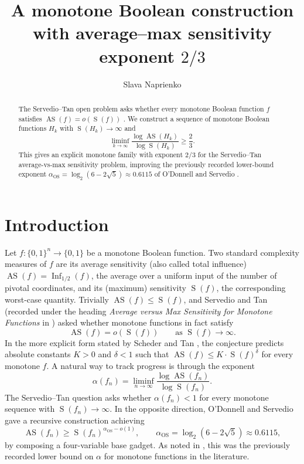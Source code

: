 \documentclass[11pt]{article}
\title{A monotone Boolean construction with average--max sensitivity exponent \(2/3\)}
\author{Slava Naprienko}
\date{}
\newcommand{\Inf}{\operatorname{Inf}}
\newcommand{\AS}{\operatorname{AS}}
\newcommand{\sens}{\operatorname{S}}
\begin{document}
\maketitle

\begin{abstract}
The Servedio--Tan open problem asks whether every monotone Boolean function \(f\) satisfies \(\AS(f)=o(\sens(f))\) \cite{FHH+14,ScTa13}. We construct a sequence of monotone Boolean functions \(H_k\) with \(\sens(H_k)\to\infty\) and
\[
    \liminf_{k\to\infty}\frac{\log\AS(H_k)}{\log\sens(H_k)}\ge \frac{2}{3}.
\]
This gives an explicit monotone family with exponent \(2/3\) for the Servedio--Tan average-vs-max sensitivity problem, improving the previously recorded lower-bound exponent
\(
    \alpha_{\mathrm{OS}}=\log_2(6-2\sqrt 5)\approx 0.6115
\)
of O'Donnell and Servedio \cite{OS07}.
\end{abstract}

\section{Introduction}

Let \(f:\{0,1\}^n\to\{0,1\}\) be a monotone Boolean function. Two standard complexity measures of \(f\) are its average sensitivity (also called total influence) \(\AS(f)=\Inf_{1/2}(f)\), the average over a uniform input of the number of pivotal coordinates, and its (maximum) sensitivity \(\sens(f)\), the corresponding worst-case quantity. Trivially \(\AS(f)\le\sens(f)\), and Servedio and Tan (recorded under the heading \emph{Average versus Max Sensitivity for Monotone Functions} in \cite{FHH+14}) asked whether monotone functions in fact satisfy
\[
    \AS(f)=o(\sens(f))
    \qquad
    \text{as }\sens(f)\to\infty.
\]
In the more explicit form stated by Scheder and Tan \cite{ScTa13}, the conjecture predicts absolute constants \(K>0\) and \(\delta<1\) such that \(\AS(f)\le K\cdot\sens(f)^\delta\) for every monotone \(f\). A natural way to track progress is through the exponent
\[
    \alpha(f_n)
    =
    \liminf_{n\to\infty}
    \frac{\log\AS(f_n)}{\log\sens(f_n)}.
\]
The Servedio--Tan question asks whether \(\alpha(f_n)<1\) for every monotone sequence with \(\sens(f_n)\to\infty\). In the opposite direction, O'Donnell and Servedio \cite{OS07} gave a recursive construction achieving
\[
    \AS(f_n)
    \ge
    \sens(f_n)^{\alpha_{\mathrm{OS}}-o(1)},
    \qquad
    \alpha_{\mathrm{OS}}=\log_2(6-2\sqrt 5)\approx 0.6115,
\]
by composing a four-variable base gadget. As noted in \cite{ScTa13}, this was the previously recorded lower bound on \(\alpha\) for monotone functions in the literature.
\end{document}
